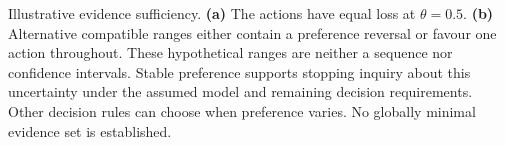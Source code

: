 Illustrative evidence sufficiency.
\textbf{(a)} The actions have equal loss at $\theta=0.5$.
\textbf{(b)} Alternative compatible ranges either contain a preference reversal
or favour one action throughout. These hypothetical ranges are neither a sequence
nor confidence intervals. Stable preference supports stopping inquiry about this
uncertainty under the assumed model and remaining decision requirements.
Other decision rules can choose when preference varies. No globally minimal
evidence set is established.
